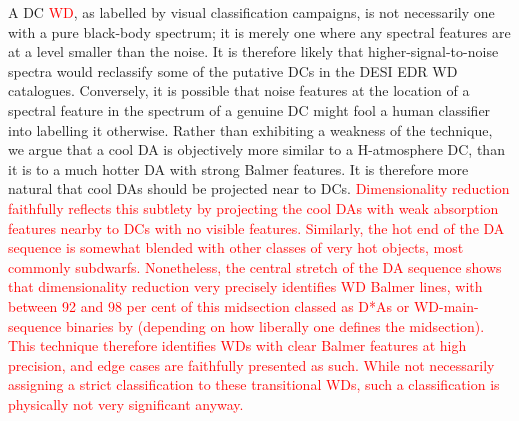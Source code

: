 \documentclass[fleqn,usenatbib]{mnras}
\newcommand{\red}[1]{\textcolor{red}{#1}}
\begin{document}
A DC \red{WD}, as labelled by visual classification campaigns, is not necessarily one with a pure black-body spectrum; it is merely one where any spectral features are at a level smaller than the noise.
It is therefore likely that higher-signal-to-noise spectra would reclassify some of the putative DCs in the DESI EDR WD catalogues.
Conversely, it is possible that noise features at the location of a spectral feature in the spectrum of a genuine DC might fool a human classifier into labelling it otherwise.
Rather than exhibiting a weakness of the technique, we argue that a cool DA is objectively more similar to a H-atmosphere DC, than it is to a much hotter DA with strong Balmer features.
It is therefore more natural that cool DAs should be projected near to DCs.
\red{
Dimensionality reduction faithfully reflects this subtlety by projecting the cool DAs with weak absorption features nearby to DCs with no visible features.
Similarly, the hot end of the DA sequence is somewhat blended with other classes of very hot objects, most commonly subdwarfs.
Nonetheless, the central stretch of the DA sequence shows that dimensionality reduction very precisely identifies WD Balmer lines, with between 92 and 98 per cent of this midsection classed as D*As or WD-main-sequence binaries by \citet{manser24} (depending on how liberally one defines the midsection).
This technique therefore identifies WDs with clear Balmer features at high precision, and edge cases are faithfully presented as such.
While not necessarily assigning a strict classification to these transitional WDs, such a classification is physically not very significant anyway. 
}
\end{document}
